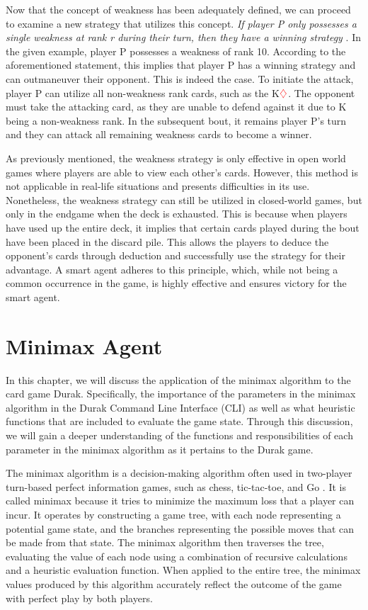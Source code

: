 Now that the concept of weakness has been adequately defined, we can proceed to examine a new strategy that utilizes this concept. \textit{If player P only possesses a single weakness at rank r during their turn, then they have a winning strategy} \citep{Bonnet2016TheCO}. In the given example, player P possesses a weakness of rank 10. According to the aforementioned statement, this implies that player P has a winning strategy and can outmaneuver their opponent. This is indeed the case. To initiate the attack, player P can utilize all non-weakness rank cards, such as the K$\textcolor{red}{\diamondsuit}$. The opponent must take the attacking card, as they are unable to defend against it due to K being a non-weakness rank. In the subsequent bout, it remains player P's turn and they can attack all remaining weakness cards to become a winner.

As previously mentioned, the weakness strategy is only effective in open world games where players are able to view each other's cards. However, this method is not applicable in real-life situations and presents difficulties in its use. Nonetheless, the weakness strategy can still be utilized in closed-world games, but only in the endgame when the deck is exhausted. This is because when players have used up the entire deck, it implies that certain cards played during the bout have been placed in the discard pile. This allows the players to deduce the opponent's cards through deduction and successfully use the strategy for their advantage. A smart agent adheres to this principle, which, while not being a common occurrence in the game, is highly effective and ensures victory for the smart agent.

\section{Minimax Agent}
\label{minimax}

In this chapter, we will discuss the application of the minimax algorithm to the card game Durak. Specifically, the importance of the parameters in the minimax algorithm in the Durak Command Line Interface (CLI) as well as what heuristic functions that are included to evaluate the game state. Through this discussion, we will gain a deeper understanding of the functions and responsibilities of each parameter in the minimax algorithm as it pertains to the Durak game.

The minimax algorithm is a decision-making algorithm often used in two-player turn-based perfect information games, such as chess, tic-tac-toe, and Go \citep{AI4Ed}. It is called minimax because it tries to minimize the maximum loss that a player can incur. It operates by constructing a game tree, with each node representing a potential game state, and the branches representing the possible moves that can be made from that state. The minimax algorithm then traverses the tree, evaluating the value of each node using a combination of recursive calculations and a heuristic evaluation function. When applied to the entire tree, the minimax values produced by this algorithm accurately reflect the outcome of the game with perfect play by both players.

